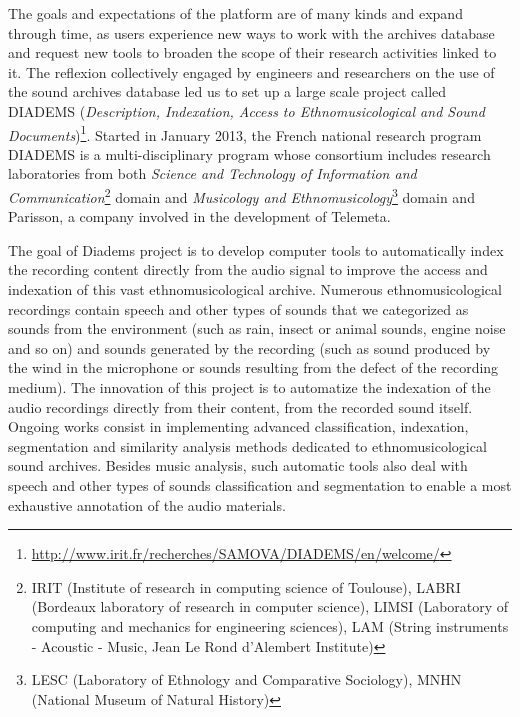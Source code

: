 \documentclass{sig-alternate}
\newcommand{\comment}[1]{\footnote{\color{red} \bf{{#1}}}}
\begin{document}
The goals and expectations of the platform are of many kinds and expand through time, as users experience new ways to work with the archives database and request new tools to broaden the scope of their research activities linked to it. The reflexion collectively engaged by engineers and researchers on the use of the sound archives database led us  to set up a large scale project called DIADEMS (\emph{Description, Indexation, Access to Ethnomusicological and Sound Documents})\footnote{\url{http://www.irit.fr/recherches/SAMOVA/DIADEMS/en/welcome/}}. 
Started in January 2013, the French national research program DIADEMS is a multi-disciplinary program whose consortium includes research laboratories from both\emph{ Science and Technology of Information and Communication}\footnote{IRIT (Institute of research in computing science of Toulouse), LABRI (Bordeaux laboratory of research in computer science), LIMSI (Laboratory of computing and mechanics for engineering sciences), LAM (String instruments - Acoustic - Music, Jean Le Rond d'Alembert Institute)} domain and \emph{Musicology and Ethnomusicology}\footnote{LESC (Laboratory of Ethnology and Comparative Sociology), MNHN (National Museum of Natural History)} domain and Parisson, a company involved in the development of Telemeta.
 
The goal of Diadems project is to develop computer tools to automatically index the recording content directly from the audio signal to improve the access and indexation of this vast ethnomusicological archive. Numerous ethnomusicological recordings contain speech and other types of sounds that we categorized as sounds from the environment (such as rain, insect or animal sounds, engine noise and so on) and sounds generated by the recording (such as sound produced by the wind in the microphone or sounds resulting from the defect of the recording medium). The innovation of this project is to automatize the indexation of the audio recordings directly from their content, from the recorded sound itself. Ongoing works consist in implementing advanced classification, indexation, segmentation and similarity analysis methods dedicated to ethnomusicological sound archives.  Besides music analysis, such automatic tools also deal with speech and other types of sounds classification and segmentation to enable a most exhaustive annotation of the audio materials.
\end{document}
